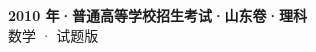 \documentclass[zihao=-4, a4paper]{ctexart}
\begin{document}
\begin{center}
  {\Large\bfseries 2010 年·普通高等学校招生考试·山东卷·理科}\\[4pt]
  {\large 数学 · 试题版}
\end{center}
\medskip
{}

\end{document}

